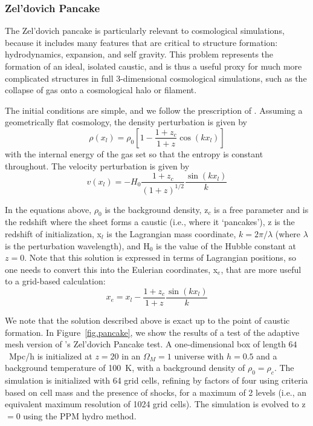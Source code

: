 \subsubsection{Zel'dovich Pancake}
\label{sec.tests.pancake}

The Zel'dovich pancake \citep{1970A&A.....5...84Z} is particularly
relevant to cosmological simulations, because it includes many
features that are critical to structure formation: hydrodynamics,
expansion, and self gravity.  This problem represents the formation of an ideal,
isolated caustic, and is thus a useful proxy for much more
complicated structures in full 3-dimensional cosmological simulations,
such as the collapse of gas onto a cosmological halo or filament.

The initial conditions are simple, and we follow the prescription of
\citet{Anninos94}.  Assuming a geometrically flat cosmology, the density
perturbation is given by
\begin{equation}
\rho(x_l) = \rho_0 \left[ 1 - \frac{1+z_c}{1+z} \cos(k x_l) \right]
\end{equation}
with the internal energy of the gas set so that the entropy 
is constant throughout.  The velocity perturbation is given by
\begin{equation}
v(x_l) = -H_0 \frac{1 + z_c}{(1+z)^{1/2}} \frac{\sin(k x_l)}{k}
\end{equation}

In the equations above, $\rho_0$ is the background density, z$_c$ is a
free parameter and is the redshift where the sheet forms a caustic
(i.e., where it `pancakes'), z is the redshift of initialization, x$_l$ is the
Lagrangian mass coordinate, $k = 2 \pi / \lambda$ (where $\lambda$ is
the perturbation wavelength), and H$_0$ is the value of the Hubble
constant at $z = 0$.  Note that this solution is expressed in terms of 
Lagrangian positions, so one needs to convert this into the Eulerian
coordinates, x$_e$, that are more useful to a grid-based calculation:
\begin{equation}
x_e = x_l - \frac{1 + z_c}{1 + z} \frac{\sin(k x_l)}{k}
\end{equation}

We note that the solution described above is exact up to the point of
caustic formation.  In Figure~\ref{fig.pancake}, we show the results
of a test of the adaptive mesh version of \enzo's Zel'dovich Pancake test.  A
one-dimensional box of length $64$~Mpc/h is initialized at $z = 20$ in
an $\Omega_M = 1$ universe with $h = 0.5$ and a background temperature
of 100~K, with a background density of $\rho_0 = \rho_c$.  The simulation is initialized with 64
grid cells, refining by factors of four using criteria based on cell
mass and the presence of shocks, for a maximum of 2 levels (i.e., an
equivalent maximum resolution of 1024 grid cells).  The simulation is
evolved to z$ = 0$ using the PPM hydro method.


